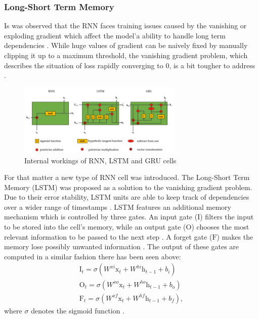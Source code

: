 \subsubsection{Long-Short Term Memory}
\label{subsubsec:ch3sec3subsec4subsubsec2}

Is was observed that the RNN faces training issues caused by the vanishing or exploding gradient which affect the model'a ability to handle long term dependencies \cite{rnn_gradient_problems}. While huge values of gradient can be naively fixed by manually clipping it up to a maximum threshold, the vanishing gradient problem, which describes the situation of loss rapidly converging to $0$, is a bit tougher to address \cite{rnn_gradient_problems}. 

\begin{figure}[htbp]
    \centering
        \includegraphics[width=0.7\textwidth]{figures/rnn_cells.PNG}
    \caption{Internal workings of RNN, LSTM and GRU cells \cite{rnn_cells_pic}}
    \label{FigRNNCells}
\end{figure}

For that matter a new type of RNN cell was introduced. The Long-Short Term Memory (LSTM) was proposed as a solution to the vanishing gradient problem. Due to their error stability, LSTM units are able to keep track of dependencies over a wider range of timestamps \cite{rnn}. LSTM features an additional memory mechanism which is controlled by three gates. An input gate ($\mathrm{I}$) filters the input to be stored into the cell's memory, while an output gate ($\mathrm{O}$) chooses the most relevant information to be passed to the next step \cite{lstm}. A forget gate ($\mathrm{F}$) makes the memory lose possibly unwanted information \cite{rnn}. The output of these gates are computed in a similar fashion there has been seen above:
\begin{gather}
\mathrm{I}_t = \sigma ( W^{xi} \mathrm{x}_t + W^{hi} \mathrm{h}_{t-1} + b_i) \\
\mathrm{O}_t = \sigma ( W^{xo} \mathrm{x}_t + W^{ho} \mathrm{h}_{t-1} + b_o) \\
\mathrm{F}_t = \sigma ( W^{xf} \mathrm{x}_t + W^{hf} \mathrm{h}_{t-1} + b_f),
\end{gather}
where $\sigma$ denotes the sigmoid function \cite{rnn}.

